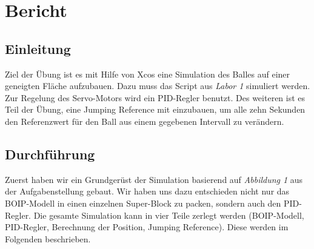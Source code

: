 \section{Bericht}

\subsection{Einleitung}
Ziel der Übung ist es mit Hilfe von Xcos eine Simulation des Balles auf einer geneigten Fläche aufzubauen. Dazu muss das Script aus \textit{Labor 1} simuliert werden. Zur Regelung des Servo-Motors wird ein PID-Regler benutzt. Des weiteren ist es Teil der Übung, eine Jumping Reference mit einzubauen, um alle zehn Sekunden den Referenzwert für den Ball aus einem gegebenen Intervall zu verändern.

\subsection{Durchführung}
Zuerst haben wir ein Grundgerüst der Simulation basierend auf \textit{Abbildung 1} aus der Aufgabenstellung gebaut. Wir haben uns dazu entschieden nicht nur das BOIP-Modell in einen einzelnen Super-Block zu packen, sondern auch den PID-Regler. Die gesamte Simulation kann in vier Teile zerlegt werden (BOIP-Modell, PID-Regler, Berechnung der Position, Jumping Reference). Diese werden im Folgenden beschrieben.

